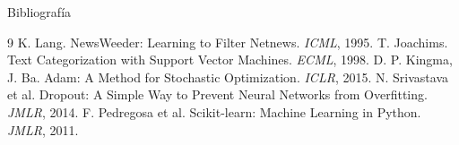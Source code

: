 \documentclass[10pt,aspectratio=169]{beamer}
\begin{document}
\begin{frame}{Bibliografía}
  \footnotesize
  \begin{thebibliography}{9}
     K. Lang. NewsWeeder: Learning to Filter Netnews. \textit{ICML}, 1995.
     T. Joachims. Text Categorization with Support Vector Machines. \textit{ECML}, 1998.
     D. P. Kingma, J. Ba. Adam: A Method for Stochastic Optimization. \textit{ICLR}, 2015.
     N. Srivastava et al. Dropout: A Simple Way to Prevent Neural Networks from Overfitting. \textit{JMLR}, 2014.
     F. Pedregosa et al. Scikit-learn: Machine Learning in Python. \textit{JMLR}, 2011.
  \end{thebibliography}
\end{frame}
\end{document}
